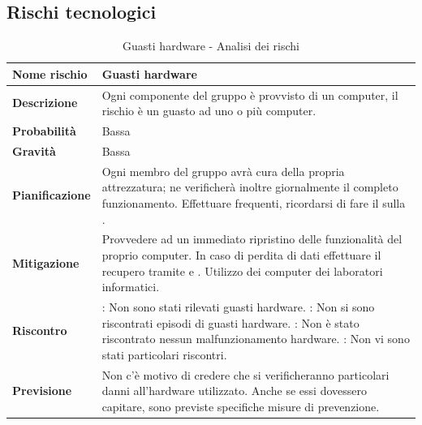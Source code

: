 \documentclass[12pt,a4paper]{article}
\begin{document}
\subsection{Rischi tecnologici}

\begin{table}[H]
	\begin{center}
		\begin{tabular}{p{} p{}}
			\toprule
			\textbf{Nome rischio} & \textbf{Guasti hardware} \\
			\midrule
			\midrule
			\textbf{Descrizione} &  Ogni componente del gruppo è provvisto di un computer, il rischio è un guasto ad uno o più computer. \\
			\midrule
			\textbf{Probabilità} & Bassa \\
			\midrule
			\textbf{Gravità} & Bassa \\
			\midrule
			\textbf{Pianificazione} & Ogni membro del gruppo avrà cura della propria attrezzatura; ne verificherà inoltre giornalmente il completo funzionamento. Effettuare \mgls{backup} frequenti, ricordarsi di fare il \mgls{push} sulla \mgls{repository}. \\
			\midrule
			\textbf{Mitigazione} & Provvedere ad un immediato ripristino delle funzionalità del proprio computer. In caso di perdita di dati effettuare il recupero tramite \mgls{backup} e \mgls{repository}. Utilizzo dei computer dei laboratori informatici. \\
			\midrule
			\textbf{Riscontro} & 
                \textbf{\FA{}}: Non sono stati rilevati guasti hardware. \newline
                \textbf{\FAD{}}: Non si sono riscontrati episodi di guasti hardware. \newline
                \textbf{\FPA{}}: Non è stato riscontrato nessun malfunzionamento hardware. \newline
                \textbf{\FPD{}}: Non vi sono stati particolari riscontri. \\
            \midrule
			\textbf{Previsione} & Non c'è motivo di credere che si verificheranno particolari danni all'hardware utilizzato. Anche se essi dovessero capitare, sono previste specifiche misure di prevenzione. \\
			\bottomrule
		\end{tabular}
		\caption{Guasti hardware - Analisi dei rischi}
	\end{center}
\end{table}
\end{document}
